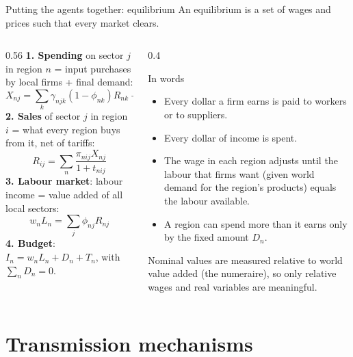 \documentclass[aspectratio=169,9pt,t]{beamer}
\begin{document}
\begin{frame}{Putting the agents together: equilibrium}
  An equilibrium is a set of wages and prices such that every market
  clears.
  \medskip
  \begin{columns}[T]
    \begin{column}{0.56\textwidth}
      \small
      \textbf{1. Spending} on sector $j$ in region $n$ = input purchases by
      local firms + final demand:
      \[ X_{nj}=\sum_k\gamma_{njk}(1-\phi_{nk})R_{nk}+\beta_{nj}I_n \]
      \textbf{2. Sales} of sector $j$ in region $i$ = what every region
      buys from it, net of tariffs:
      \[ R_{ij}=\sum_n\frac{\pi_{nij}X_{nj}}{1+t_{nij}} \]
      \textbf{3. Labour market}: labour income = value added of all
      local sectors:
      \[ w_nL_n=\sum_j\phi_{nj}R_{nj} \]
      \textbf{4. Budget}: $I_n=w_nL_n+D_n+T_n$, with $\sum_nD_n=0$.
    \end{column}
    \begin{column}{0.4\textwidth}
      \begin{block}{In words}
        \small
        \begin{itemize}
          \item Every dollar a firm earns is paid to workers or to
                suppliers.
          \item Every dollar of income is spent.
          \item The wage in each region adjusts until the labour that
                firms want (given world demand for the region's products)
                equals the labour available.
          \item A region can spend more than it earns only by the fixed
                amount $D_n$.
        \end{itemize}
      \end{block}
      \small
      Nominal values are measured relative to world value added (the
      numeraire), so only relative wages and real variables are
      meaningful.
    \end{column}
  \end{columns}
\end{frame}

\section{Transmission mechanisms}
\end{document}
